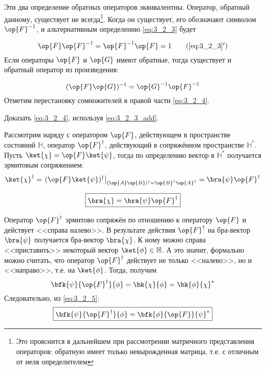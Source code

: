 \noindent
Эти два определение обратных операторов эквивалентны. Оператор, обратный данному, существует не всегда\footnote{Это прояснится в дальнейшем при рассмотрении матричного представления операторов: обратную имеет только невырожденная матрица, т.е. с отличным от неля определителем}. Когда он существует, его обозначают символом $\op{F}^{-1}$, и альтернативным определению \eqref{eq:3_2_3} будет

\begin{equation}
\label{eq:3_2_3_add}
\op{F}\op{F}^{-1} = \op{F}^{-1}\op{F} = 1
\tag{\ref{eq:3_2_3}$'$}
\end{equation}%
%
Если операторы $\op{F}$ и $\op{G}$ имеют обратные, тогда существует и обратный оператор из произведения: 

\begin{equation}
\label{eq:3_2_4}
(\op{F}\op{G})^{-1} = \op{G}^{-1} \op{F}^{-1}
\end{equation}%
%
Отметим перестановку сомножителей в правой части \eqref{eq:3_2_4}.

\begin{excr}
Доказать \eqref{eq:3_2_4}, используя \eqref{eq:3_2_3_add}.
\end{excr}

Рассмотрим наряду с оператором  $\op{F}$, действующем в пространстве состояний $\mathbb{H}$, оператор $\op{F}^\dag$, действующий в сопряжённом пространстве $\mathbb{H}^*$. Пусть $\ket{\chi} = \op{F}\ket{\psi}$, тогда по определению вектор в $\mathbb{H}^*$ получается эрмитовым сопряжением:
$$
\ket{\chi}^\dag = \left. (\op{F}\ket{\psi})^\dag \right|_{(\op{A}\op{B})^\dag = \op{B}^\dag \op{A}^\dag} = \bra{\psi} \op{F}^\dag
$$

\begin{equation}
\label{eq:3_2_5}
\boxed{
	\bra{\chi} = \bra{\psi} \op{F}^\dag
}
\end{equation}

Оператор $\op{F}^\dag$ эрмитово сопряжён по отношению к оператору $\op{F}$ и действует <<справа налево>>. В результате действия $\op{F}^\dag$ на бра-вектор $\bra{\psi}$ получается бра-вектор $\bra{\chi}$. К ному можно справа <<приставить>> некоторый вектор $\ket{\phi} \in \mathbb{H}$. А это значит, формально можно считать, что оператор $\op{F}^\dag$ действует не только <<налево>>, но и <<направо>>, т.е. на $\ket{\phi}$. Тогда, получим%
%
$$
\bfk{\psi}{\op{F}^\dag}{\phi} = \bk{\chi}{\phi} = \bk{\phi}{\chi}^*
$$%
%
Следовательно, из \eqref{eq:3_2_5}:%
%
\begin{equation}
\label{eq:3_2_6}
\boxed{
  \bfk{\psi}{\op{F}^\dag}{\phi} = \bfk{\phi}{\op{F}}{\psi}^*
}
\end{equation}

